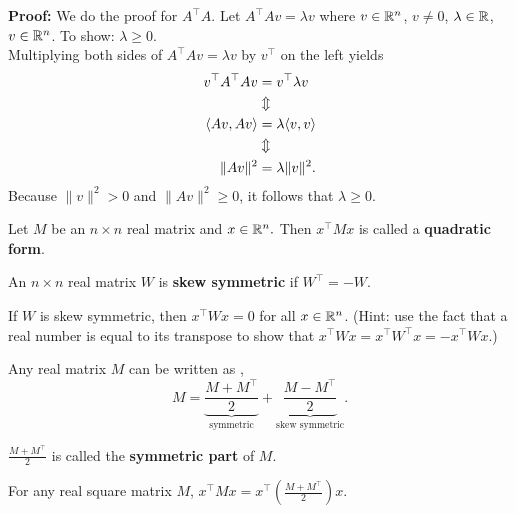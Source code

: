 \textbf{Proof:} We do the proof for $A^\top A$. Let $A^\top Av=\lambda v$ where $v\in \mathbb R^n$, $v \neq 0$, $\lambda \in \mathbb R$, $v\in\mathbb R^n$. To show: $\lambda \geq 0$.\\

    Multiplying both sides of $A^\top Av=\lambda v$ by $v^\top $ on the left yields
    \begin{align*}
        v^\top A^\top Av &= v^\top\lambda v\\
             & \Updownarrow \\
        \langle Av, Av \rangle &=\lambda \langle v,v \rangle\\
             & \Updownarrow \\
       \Arrowvert Av \Arrowvert^2 &= \lambda \Arrowvert v \Arrowvert^2.
    \end{align*}
Because $\| v \|^2 > 0$ and $\| Av \|^2 \geq 0$, it follows that $\lambda \geq 0$.
\Qed

\begin{definition}
 Let $M$ be an $n \times n$ real matrix and $x \in \mathbb R^n.$ Then $x^\top Mx$ is called a \textbf{quadratic form}.
\end{definition}

\begin{definition}
 An $n \times n$ real matrix $W$ is \textbf{skew symmetric} if $W^\top = -W$.
\end{definition}

\begin{exercise}
 If $W$ is skew symmetric, then $x^\top Wx=0$ for all $x \in \mathbb R^n$. (Hint: use the fact that a real number is equal to its transpose to show that  $x^\top Wx=x^\top W^\top x = -x^\top Wx$.) 
\end{exercise}

\begin{exercise} Any real matrix $M$ can be written as , $$M=\underbrace{\frac{M+M^\top }{2}}_\text{symmetric}+\underbrace{\frac{M-M^\top }{2}}_\text{skew symmetric}.$$
\end{exercise}

\begin{definition}
  $\frac{M+M^\top }{2}$ is called the \textbf{symmetric part} of $M$.
\end{definition}

\begin{exercise} For any real square matrix $M$, 
$x^\top Mx=x^\top \left(\frac{M+M^\top }{2} \right)x.$
\end{exercise} 

